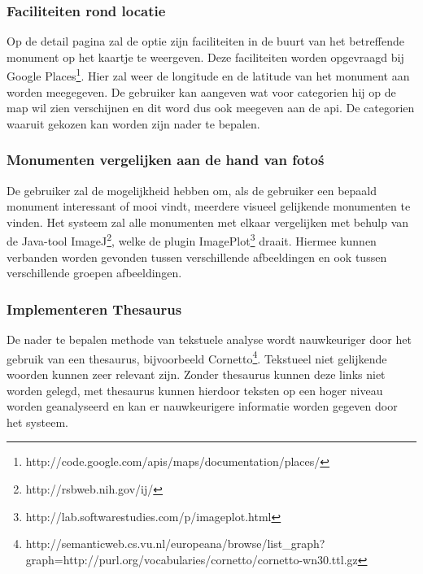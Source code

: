 \documentclass[a4paper,10pt]{article}
\begin{document}
			\subsubsection{Faciliteiten rond locatie}
			Op de detail pagina zal de optie zijn faciliteiten in de buurt van het betreffende monument op het kaartje te weergeven. Deze faciliteiten worden opgevraagd bij Google Places\footnote{http://code.google.com/apis/maps/documentation/places/}. Hier zal weer de longitude en de latitude van het monument aan worden meegegeven. De gebruiker kan aangeven wat voor categorien hij op de map wil zien verschijnen en dit word dus ook meegeven aan de api. De categorien waaruit gekozen kan worden zijn nader te bepalen.
				
			\subsubsection{Monumenten vergelijken aan de hand van foto\'s}
			De gebruiker zal de mogelijkheid hebben om, als de gebruiker een bepaald monument interessant of mooi vindt, meerdere visueel gelijkende monumenten te vinden. Het systeem zal alle monumenten met elkaar vergelijken met behulp van de Java-tool ImageJ\footnote{http://rsbweb.nih.gov/ij/}, welke de plugin ImagePlot\footnote{http://lab.softwarestudies.com/p/imageplot.html} draait. Hiermee kunnen verbanden worden gevonden tussen verschillende afbeeldingen en ook tussen verschillende groepen afbeeldingen.
				
			\subsubsection{Implementeren Thesaurus}
			De nader te bepalen methode van tekstuele analyse wordt nauwkeuriger door het gebruik van een thesaurus, bijvoorbeeld Cornetto\footnote{http://semanticweb.cs.vu.nl/europeana/browse/list\_graph?graph=http://purl.org/vocabularies/cornetto/cornetto-wn30.ttl.gz}. Tekstueel niet gelijkende woorden kunnen zeer relevant zijn. Zonder thesaurus kunnen deze links niet worden gelegd, met thesaurus kunnen hierdoor teksten op een hoger niveau worden geanalyseerd en kan er nauwkeurigere informatie worden gegeven door het systeem.
		
\end{document}
